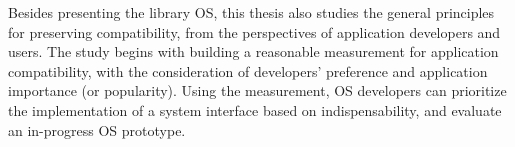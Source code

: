 





Besides presenting the \graphene{} library OS, this thesis also studies the general principles
for preserving compatibility, from the perspectives of application developers and users.
The study begins with building a reasonable measurement for
application compatibility, with the consideration of developers' preference
and application importance (or popularity).
Using the measurement,
OS developers can prioritize the implementation of a system interface based on indispensability,
and evaluate an in-progress OS prototype.


